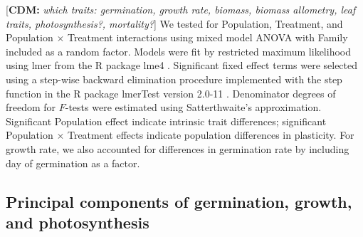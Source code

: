 \documentclass[11pt, oneside]{article}\usepackage[]{graphicx}\usepackage[]{color}
\newcommand{\pkg}[1]{{\fontseries{b}\selectfont #1}}
\newcommand{\cdm}[1]{{ \color{magenta} [{\bf{CDM:}} {\em#1}]}} %
\begin{document}
\cdm{which traits: germination, growth rate, biomass, biomass allometry, leaf traits, photosynthesis?, mortality?}
We tested for Population, Treatment, and Population $\times$ Treatment interactions using mixed model ANOVA with Family included as a random factor. Models were fit by restricted maximum likelihood using lmer from the R package \pkg{lme4} \citep{Bates_etal_2014}. Significant fixed effect terms were selected using a step-wise backward elimination procedure implemented with the step function in the R package \pkg{lmerTest} version 2.0-11 \citep{Kuznetsova_etal_2014}. Denominator degrees of freedom for $F$-tests were estimated using Satterthwaite's approximation. Significant Population effect indicate intrinsic trait differences; significant Population $\times$ Treatment effects indicate population differences in plasticity. For growth rate, we also accounted for differences in germination rate by including day of germination as a factor.

\subsection*{Principal components of germination, growth, and photosynthesis}
\end{document}
